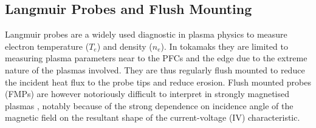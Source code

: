 \documentclass[a4paper, 12pt]{article} %
\begin{document}


\subsection{\label{subsec:lps}Langmuir Probes and Flush Mounting}
	Langmuir probes are a widely used diagnostic in plasma physics to measure electron temperature ($T_e$) and density ($n_e$). 
	In tokamaks they are limited to measuring plasma parameters near to the PFCs and the edge due to the extreme nature of the plasmas involved. 
	They are thus regularly flush mounted to reduce the incident heat flux to the probe tips and reduce erosion. 
	Flush mounted probes (FMPs) are however notoriously difficult to interpret in strongly magnetised plasmas \cite{Matthews1994}, notably because of the strong dependence on incidence angle of the magnetic field on the resultant shape of the current-voltage (IV) characteristic.
	
\end{document}
